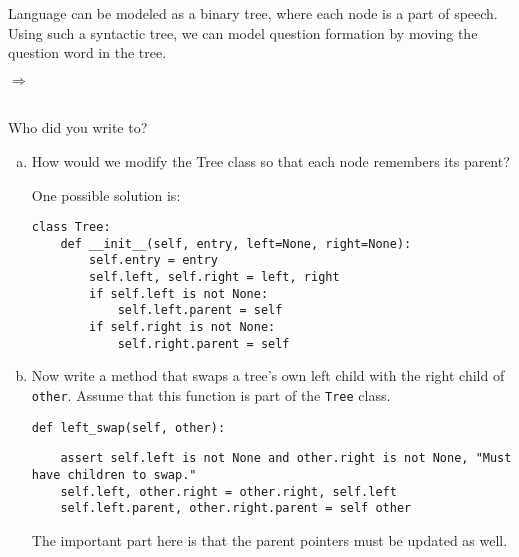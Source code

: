 \question Language can be modeled as a binary tree, where each node is a part of speech. Using such a syntactic tree, we can model question formation by moving the question
word in the tree.
\begin{center}
$\Longrightarrow$
\\
Who did you write to?
\end{center}

\begin{enumerate}[a.]
    \item How would we modify the Tree class so that each node remembers its
        parent?
        \begin{solution}[1in]
            One possible solution is:
\begin{lstlisting}
class Tree:
    def __init__(self, entry, left=None, right=None):
        self.entry = entry
        self.left, self.right = left, right
        if self.left is not None:
            self.left.parent = self
        if self.right is not None:
            self.right.parent = self
\end{lstlisting}
            \end{solution}

    \item Now write a method that swaps a tree's own left child with the right
        child of {\tt other}. Assume that this function is part of the \texttt{Tree} class.
\begin{lstlisting}
def left_swap(self, other):
\end{lstlisting}
\begin{solution}[1in]
\begin{lstlisting}
    assert self.left is not None and other.right is not None, "Must have children to swap."
    self.left, other.right = other.right, self.left
    self.left.parent, other.right.parent = self other
\end{lstlisting}

The important part here is that the parent pointers must be updated as well.
\end{solution}

\end{enumerate}
